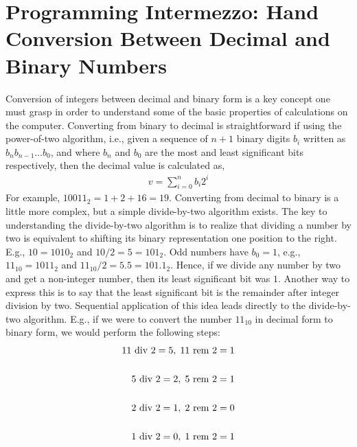 \documentclass[fsharpNotes.tex]{subfiles}
\begin{document}
\section{Programming Intermezzo: Hand Conversion Between Decimal and Binary Numbers}
\label{sec:divideByTwo}
Conversion of integers between decimal and binary form is a key concept one must grasp in order to understand some of the basic properties of calculations on the computer. Converting from binary to decimal is straightforward if using the power-of-two algorithm, i.e., given a sequence of $n+1$ binary digits $b_i$ written as $b_n b_{n-1}\dots b_0$, and where $b_n$ and $b_0$ are the most and least significant bits respectively, then the decimal value is calculated as,
\begin{align}
  v = \sum_{i=0}^nb_i2^i
\end{align}
For example, $10011_2 = 1+2+16 = 19$. Converting from decimal to binary is a little more complex, but a simple divide-by-two algorithm exists. The key to understanding the divide-by-two algorithm is to realize that dividing a number by two is equivalent to shifting its binary representation one position to the right. E.g., $10 = 1010_2$ and $10/2 = 5 = 101_2$. Odd numbers have $b_0=1$, e.g., $11_{10} = 1011_2$ and $11_{10}/2 = 5.5 = 101.1_2$. Hence, if we divide any number by two and get a non-integer number, then its least significant bit was $1$. Another way to express this is to say that the least significant bit is the remainder after integer division by two. Sequential application of this idea leads directly to the divide-by-two algorithm. E.g., if we were to convert the number $11_{10}$ in decimal form to binary form, we would perform the following steps:
\begin{align*}
  11\tikzmark{a1} \text{ div } 2 = \tikzmark{a2}5\tikzmark{a3},\;   \tikzmark{a4}11  \text{ rem }  2 & =\tikzmark{a5}1\tikzmark{a6}\\
  \nonumber \\
  5\tikzmark{b1} \text{ div }  2 = \tikzmark{b2}2\tikzmark{b3},\;  \tikzmark{b4}5  \text{ rem } 2 & =\tikzmark{b5}1\tikzmark{b6}\\
  \\\nonumber
  2\tikzmark{c1}  \text{ div }  2 = \tikzmark{c2}1\tikzmark{c3},\;   \tikzmark{c4}2 \text{ rem }  2 & =\tikzmark{c5}0\tikzmark{c6} \\
  \\\nonumber
  1\tikzmark{d1}  \text{ div }  2 = \tikzmark{d2}0\tikzmark{d3},\;   \tikzmark{d4}1  \text{ rem }  2 & =\tikzmark{d5}1\tikzmark{d6}\\
\end{align*}%
\end{document}
